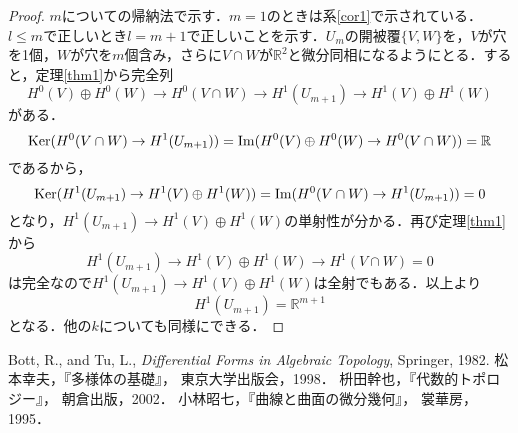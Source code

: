 \documentclass[uplatex]{jsarticle}
\begin{document}
\begin{proof}
$m$についての帰納法で示す．$m=1$のときは系\ref{cor1}で示されている．$l\leq m$で正しいとき$l=m+1$で正しいことを示す．$U_m$の開被覆$\{V,W\}$を，$V$が穴を1個，$W$が穴を$m$個含み，さらに$V\cap W$が$\mathbb{R}^2$と微分同相になるようにとる．すると，定理\ref{thm1}から完全列
\[ H^0(V)\oplus H^0(W)\to H^0(V\cap W)\to H^1(U_{m+1})\to H^1(V)\oplus H^1(W) \]
がある．
\[ \operatorname{Ker} (H^0(V\cap W)\to H^1(U_{m+1}))=\operatorname{Im}(H^0(V)\oplus H^0(W)\to H^0(V\cap W))=\mathbb{R} \]
であるから，
\[ \operatorname{Ker}(H^1(U_{m+1})\to H^1(V)\oplus H^1(W))= \operatorname{Im}(H^0(V\cap W)\to H^1(U_{m+1}))=0 \]
となり，$H^1(U_{m+1})\to H^1(V)\oplus H^1(W)$の単射性が分かる．再び定理\ref{thm1}から
\[ H^1(U_{m+1})\to H^1(V)\oplus H^1(W)\to H^1(V\cap W)=0 \]
は完全なので$H^1(U_{m+1})\to H^1(V)\oplus H^1(W)$は全射でもある．以上より
\[ H^1(U_{m+1})=\mathbb{R}^{m+1} \]
となる．他の$k$についても同様にできる．
\end{proof}
\begin{thebibliography}{9}
  Bott, R., and Tu, L., 
  \textit{Differential Forms in Algebraic Topology},
  Springer, 1982.
  松本幸夫，『多様体の基礎』，
  東京大学出版会，1998．
  枡田幹也，『代数的トポロジー』，
  朝倉出版，2002．
  小林昭七，『曲線と曲面の微分幾何』，
  裳華房，1995．
\end{thebibliography}
\end{document}
